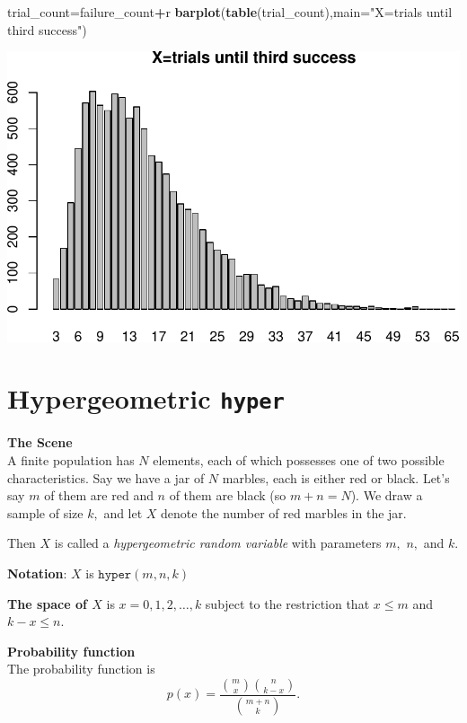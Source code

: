 \documentclass[
]{book}
\newenvironment{Shaded}{\begin{snugshade}}{\end{snugshade}}
\newcommand{\AttributeTok}[1]{\textcolor[rgb]{0.13,0.29,0.53}{#1}}
\newcommand{\FunctionTok}[1]{\textcolor[rgb]{0.13,0.29,0.53}{\textbf{#1}}}
\newcommand{\NormalTok}[1]{#1}
\newcommand{\OtherTok}[1]{\textcolor[rgb]{0.56,0.35,0.01}{#1}}
\newcommand{\SpecialCharTok}[1]{\textcolor[rgb]{0.81,0.36,0.00}{\textbf{#1}}}
\newcommand{\StringTok}[1]{\textcolor[rgb]{0.31,0.60,0.02}{#1}}
\theoremstyle{definition}
\theoremstyle{definition}
\theoremstyle{definition}
\theoremstyle{definition}
\theoremstyle{remark}
\begin{document}
\begin{Shaded}
\begin{Highlighting}[]
\NormalTok{trial\_count}\OtherTok{=}\NormalTok{failure\_count}\SpecialCharTok{+}\NormalTok{r}
\FunctionTok{barplot}\NormalTok{(}\FunctionTok{table}\NormalTok{(trial\_count),}\AttributeTok{main=}\StringTok{"X=trials until third success"}\NormalTok{)}
\end{Highlighting}
\end{Shaded}

\includegraphics{math340-notes_files/figure-latex/unnamed-chunk-171-1.pdf}

\section{\texorpdfstring{Hypergeometric \texttt{hyper}}{Hypergeometric hyper}}\label{hyperR}

\textbf{The Scene}\\
A finite population has \(N\) elements, each of which possesses one of two possible characteristics. Say we have a jar of \(N\) marbles, each is either red or black. Let's say \(m\) of them are red and \(n\) of them are black (so \(m + n = N\)). We draw a sample of size \(k,\) and let \(X\) denote the number of red marbles in the jar.

Then \(X\) is called a \emph{hypergeometric random variable} with parameters \(m,\) \(n,\) and \(k\).

\textbf{Notation}: \(X\) is \(\texttt{hyper}(m,n,k)\)

\textbf{The space of \(X\)} is \(x = 0,1,2,\ldots,k\) subject to the restriction that \(x \leq m\) and \(k - x \leq n\).

\textbf{Probability function}\\
The probability function is \[p(x)= \frac{\binom{m}{x}\binom{n}{k-x}}{\binom{m+n}{k}}.\]
\end{document}
